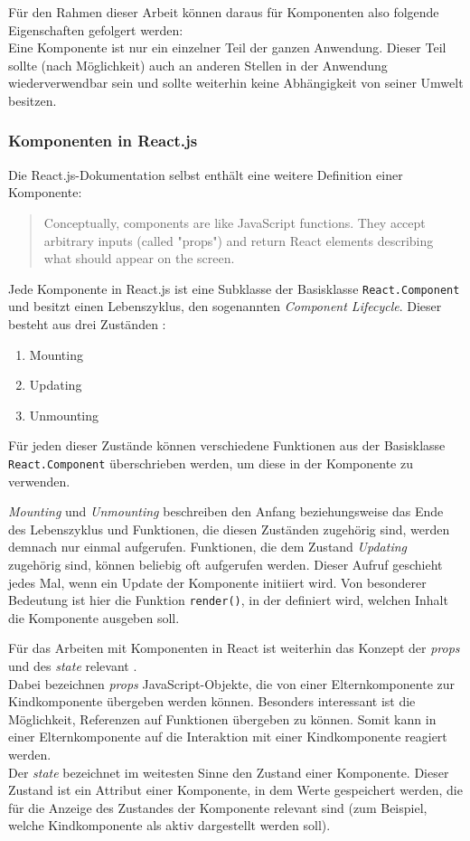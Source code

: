 Für den Rahmen dieser Arbeit können daraus für Komponenten also folgende Eigenschaften gefolgert werden:\\
Eine Komponente ist nur ein einzelner Teil der ganzen Anwendung. Dieser Teil sollte (nach Möglichkeit) auch an anderen Stellen in der Anwendung wiederverwendbar sein und sollte weiterhin keine Abhängigkeit von seiner Umwelt besitzen.

\subsubsection{Komponenten in React.js}
Die React.js-Dokumentation selbst enthält eine weitere Definition einer Komponente:

\begin{quote}
  Conceptually, components are like JavaScript functions. They accept arbitrary inputs (called "props") and return React elements describing what should appear on the screen. \cite{ReactProps}
\end{quote}

Jede Komponente in React.js ist eine Subklasse der Basisklasse \verb|React.Component| und besitzt einen Lebenszyklus, den sogenannten \textit{Component Lifecycle}. Dieser besteht aus drei Zuständen \cite{ReactCom}:

\begin{enumerate}
  \item Mounting
  \item Updating
  \item Unmounting
\end{enumerate}

Für jeden dieser Zustände können verschiedene Funktionen aus der Basisklasse \verb|React.Component| überschrieben werden, um diese in der Komponente zu verwenden.

\textit{Mounting} und \textit{Unmounting} beschreiben den Anfang beziehungsweise das Ende des Lebenszyklus und Funktionen, die diesen Zuständen zugehörig sind, werden demnach nur einmal aufgerufen.
Funktionen, die  dem Zustand \textit{Updating} zugehörig sind, können beliebig oft aufgerufen werden. Dieser Aufruf geschieht jedes Mal, wenn ein Update der Komponente initiiert wird. Von besonderer Bedeutung ist hier die Funktion \verb|render()|, in der definiert wird, welchen Inhalt die Komponente ausgeben soll.

Für das Arbeiten mit Komponenten in React ist weiterhin das Konzept der \textit{props} und des \textit{state} relevant \cite{ReactProps}.\\
Dabei bezeichnen \textit{props} JavaScript-Objekte, die von einer Elternkomponente zur Kindkomponente übergeben werden können. Besonders interessant ist die Möglichkeit, Referenzen auf Funktionen übergeben zu können. Somit kann in einer Elternkomponente auf die Interaktion mit einer Kindkomponente reagiert werden.\\
Der \textit{state} bezeichnet im weitesten Sinne den Zustand einer Komponente. Dieser Zustand ist ein Attribut einer Komponente, in dem Werte gespeichert werden, die für die Anzeige des Zustandes der Komponente relevant sind (zum Beispiel, welche Kindkomponente als aktiv dargestellt werden soll).\\

